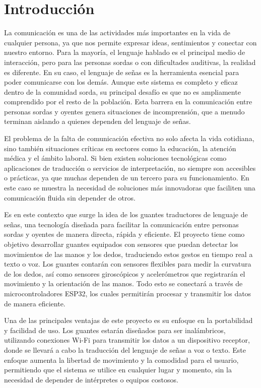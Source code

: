 \section{Introducción}
La comunicación es una de las actividades más importantes en la vida de cualquier persona, ya que nos permite expresar ideas, sentimientos y conectar con nuestro entorno. Para la mayoría, el lenguaje hablado es el principal medio de interacción, pero para las personas sordas o con dificultades auditivas, la realidad es diferente. En su caso, el lenguaje de señas es la herramienta esencial para poder comunicarse con los demás. Aunque este sistema es completo y eficaz dentro de la comunidad sorda, su principal desafío es que no es ampliamente comprendido por el resto de la población. Esta barrera en la comunicación entre personas sordas y oyentes genera situaciones de incomprensión, que a menudo terminan aislando a quienes dependen del lenguaje de señas. 

El problema de la falta de comunicación efectiva no solo afecta la vida cotidiana, sino también situaciones críticas en sectores como la educación, la atención médica y el ámbito laboral. Si bien existen soluciones tecnológicas como aplicaciones de traducción o servicios de interpretación, no siempre son accesibles o prácticas, ya que muchas dependen de un tercero para su funcionamiento. En este caso se muestra la necesidad de soluciones más innovadoras que faciliten una comunicación fluida sin depender de otros.

Es en este contexto que surge la idea de los guantes traductores de lenguaje de señas, una tecnología diseñada para facilitar la comunicación entre personas sordas y oyentes de manera directa, rápida y eficiente. El proyecto tiene como objetivo desarrollar guantes equipados con sensores que puedan detectar los movimientos de las manos y los dedos, traduciendo estos gestos en tiempo real a texto o voz. Los guantes contarán con sensores flexibles para medir la curvatura de los dedos, así como sensores giroscópicos y acelerómetros que registrarán el movimiento y la orientación de las manos. Todo esto se conectará a través de microcontroladores ESP32, los cuales permitirán procesar y transmitir los datos de manera eficiente.

Una de las principales ventajas de este proyecto es su enfoque en la portabilidad y facilidad de uso. Los guantes estarán diseñados para ser inalámbricos, utilizando conexiones Wi-Fi para transmitir los datos a un dispositivo receptor, donde se llevará a cabo la traducción del lenguaje de señas a voz o texto. Este enfoque aumenta la libertad de movimiento y la comodidad para el usuario, permitiendo que el sistema se utilice en cualquier lugar y momento, sin la necesidad de depender de intérpretes o equipos costosos.

